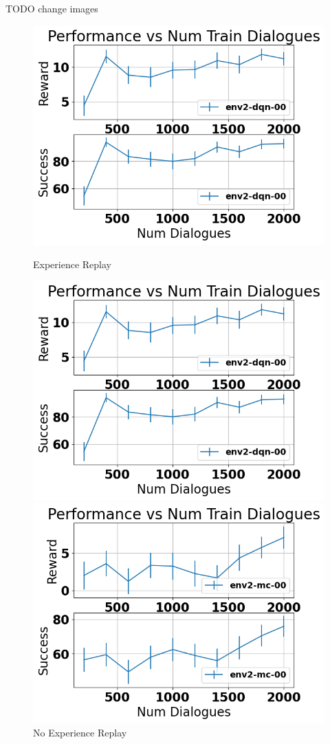 \documentclass[12pt,titlepage,a4paper]{article}
\begin{document}
TODO change images
\begin{figure}[!htb]
      \includegraphics[width=\linewidth]{env2-CamRestaurants-experience.png}
      \caption{Experience Replay}
    \endminipage\hfill
      \includegraphics[width=\linewidth]{env2-CamRestaurants-experience.png}
      \caption{No Experience Replay}
    \endminipage\hfill
      \includegraphics[width=\linewidth]{env2-CamRestaurants-mc.png}

\end{figure}
\end{document}
